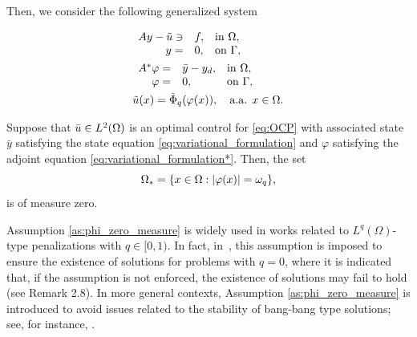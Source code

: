 	Then, we consider the following generalized system 
	
	\begin{subequations}\label{eq:system2.5}
		\begin{align} 
			&	\begin{array}{rll}
				A   y - \tilde u \ni &f, &\hbox{in  } \Omega, \\
				y=&0, &\hbox{on  }  \Gamma,
			\end{array} \\
			&\begin{array}{rll}
				A^*   \varphi=& \bar y -y_d, &\hbox{in  } \Omega, \\
				\varphi=&0, &\hbox{on  }  \Gamma,
			\end{array}\label{eq:statey_2}\\
			&\tilde u (x) = \tilde\Phi_q (\varphi(x)), \quad  \text{a.a. } x \in \Omega. \label{eq:uPhi.1}
		\end{align} 	
	\end{subequations}
	
\begin{assumption}\label{as:phi_zero_measure}
    Suppose that $\bar u \in L^2(\Omega)$ is an optimal control for \eqref{eq:OCP} with 
	associated state $\bar y$ satisfying the state equation \eqref{eq:variational_formulation}
	 and $\varphi$ satisfying the adjoint equation \eqref{eq:variational_formulation*}. Then, the set
    $$\Omega_*=\{x \in \Omega : |\varphi(x)|=\omega_q\},$$
    is of measure zero.
\end{assumption}

\begin{remark}
    Assumption \ref{as:phi_zero_measure} is widely used in works related to $L^q(\Omega)$-type penalizations 
	with $q \in [0,1)$. In fact, in~\cite{ito-kunisch2014}, this assumption is imposed to ensure the existence 
	of solutions for problems with $q = 0$, where it is indicated that, if the assumption is not enforced, 
	the existence of solutions may fail to hold (see Remark 2.8). In more general contexts, Assumption \ref{as:phi_zero_measure} 
	is introduced to avoid issues related to the stability of bang-bang type solutions; see, for instance, 
	\cite{casas-wachsmuth-wachsmuth2017,deckelnick-hinze2010, corella-jork-veliov2022,wachsmuth2011}.
\end{remark}

